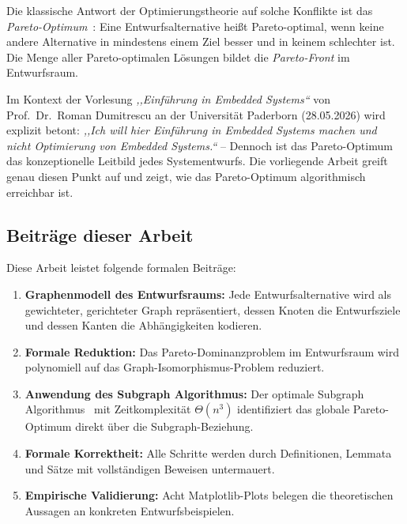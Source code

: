 ﻿\documentclass[a4paper,12pt]{article}
\theoremstyle{definition}
\begin{document}
Die klassische Antwort der Optimierungstheorie auf solche Konflikte ist das
\emph{Pareto-Optimum}~\cite{pareto1896cours}: Eine Entwurfsalternative hei{\ss}t
Pareto-optimal, wenn keine andere Alternative in mindestens einem Ziel besser
und in keinem schlechter ist.
Die Menge aller Pareto-optimalen L\"{o}sungen bildet die \emph{Pareto-Front} im
Entwurfsraum.

Im Kontext der Vorlesung \emph{,,Einf\"{u}hrung in Embedded Systems``} von
Prof.\ Dr.\ Roman Dumitrescu an der Universit\"{a}t Paderborn (28.05.2026) wird
explizit betont: \emph{,,Ich will hier Einf\"{u}hrung in Embedded Systems machen
und nicht Optimierung von Embedded Systems.``} -- Dennoch ist das Pareto-Optimum
das konzeptionelle Leitbild jedes Systementwurfs.
Die vorliegende Arbeit greift genau diesen Punkt auf und zeigt, wie das
Pareto-Optimum algorithmisch erreichbar ist.

\subsection{Beitr\"{a}ge dieser Arbeit}

Diese Arbeit leistet folgende formalen Beitr\"{a}ge:
\begin{enumerate}
    \item \textbf{Graphenmodell des Entwurfsraums:} Jede Entwurfsalternative wird
          als gewichteter, gerichteter Graph repr\"{a}sentiert, dessen Knoten die
          Entwurfsziele und dessen Kanten die Abh\"{a}ngigkeiten kodieren.
    \item \textbf{Formale Reduktion:} Das Pareto-Dominanzproblem im
          Entwurfsraum wird polynomiell auf das Graph-Isomorphismus-Problem
          reduziert.
    \item \textbf{Anwendung des Subgraph Algorithmus:} Der optimale
          Subgraph Algorithmus~\cite{epp2026subgraph} mit Zeitkomplexit\"{a}t
          $\Theta(n^3)$ identifiziert das globale Pareto-Optimum direkt \"{u}ber
          die Subgraph-Beziehung.
    \item \textbf{Formale Korrektheit:} Alle Schritte werden durch Definitionen,
          Lemmata und S\"{a}tze mit vollst\"{a}ndigen Beweisen untermauert.
    \item \textbf{Empirische Validierung:} Acht Matplotlib-Plots belegen die
          theoretischen Aussagen an konkreten Entwurfsbeispielen.
\end{enumerate}

\end{document}
